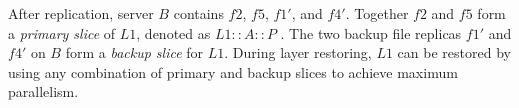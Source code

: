 After replication, server $B$ contains $f2$, $f5$, $f1'$, and $f4'$. Together
$f2$ and $f5$ form a \emph{primary slice} of $L1$, denoted as $L1::A::P$ .
The two backup file replicas 
$f1'$ and $f4'$ on $B$ form a \emph{backup slice} for $L1$.
During layer restoring, $L1$ can be restored by using any combination of primary and backup slices
to achieve maximum parallelism.
%

%

